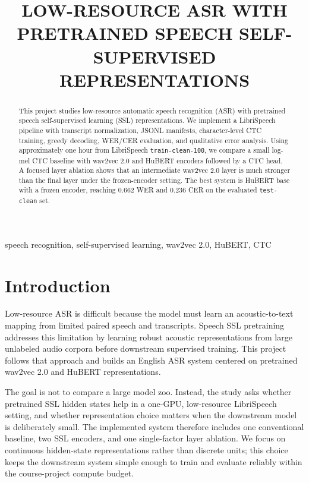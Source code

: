 \documentclass{article}
\title{LOW-RESOURCE ASR WITH PRETRAINED SPEECH SELF-SUPERVISED REPRESENTATIONS}
\begin{document}
\maketitle

\begin{abstract}
This project studies low-resource automatic speech recognition (ASR) with
pretrained speech self-supervised learning (SSL) representations. We implement
a LibriSpeech pipeline with transcript normalization, JSONL manifests,
character-level CTC training, greedy decoding, WER/CER evaluation, and
qualitative error analysis. Using approximately one hour from LibriSpeech
\texttt{train-clean-100}, we compare a small log-mel CTC baseline with
wav2vec 2.0 and HuBERT encoders followed by a CTC head. A focused layer
ablation shows that an intermediate wav2vec 2.0 layer is much stronger than
the final layer under the frozen-encoder setting. The best system is HuBERT
base with a frozen encoder, reaching 0.662 WER and 0.236 CER on the evaluated
\texttt{test-clean} set.
\end{abstract}

\begin{keywords}
speech recognition, self-supervised learning, wav2vec 2.0, HuBERT, CTC
\end{keywords}

\section{Introduction}

Low-resource ASR is difficult because the model must learn an acoustic-to-text
mapping from limited paired speech and transcripts. Speech SSL pretraining
addresses this limitation by learning robust acoustic representations from
large unlabeled audio corpora before downstream supervised training. This
project follows that approach and builds an English ASR system centered on
pretrained wav2vec 2.0 \cite{baevski2020wav2vec} and HuBERT
\cite{hsu2021hubert} representations.

The goal is not to compare a large model zoo. Instead, the study asks whether
pretrained SSL hidden states help in a one-GPU, low-resource LibriSpeech
setting, and whether representation choice matters when the downstream model
is deliberately small. The implemented system therefore includes one
conventional baseline, two SSL encoders, and one single-factor layer ablation.
We focus on continuous hidden-state representations rather than discrete units;
this choice keeps the downstream system simple enough to train and evaluate
reliably within the course-project compute budget.
\end{document}
